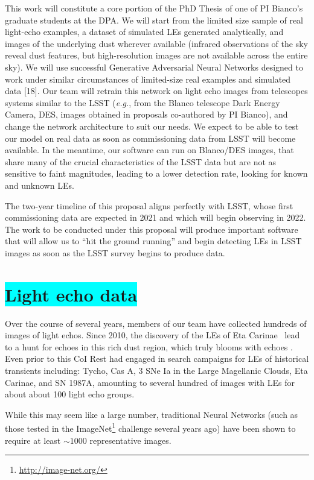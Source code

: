 \documentclass{proposalnsf}
\newcommand{\armin}[1]{\colorbox{cyan}{#1}}
\newcommand{\eg}{\emph{e.g.}}
\begin{document}
 This work will constitute a core portion of the PhD Thesis of one of PI Bianco’s graduate students at the DPA.   We will start from the limited size sample of real light-echo examples, a dataset of simulated LEs generated analytically, and images of the underlying dust wherever available (infrared observations of the sky reveal dust features, but high-resolution images are not available across the entire sky).   We will use successful Generative Adversarial Neural Networks designed to work under similar circumstances of limited-size real examples and simulated data [18].   Our team will retrain this network on light echo images from telescopes systems similar to the LSST (\eg,  from the Blanco telescope Dark Energy Camera, DES, images obtained in proposals co-authored by PI Bianco), and change the network architecture to suit our needs.  We expect to be able to test our model on real data as soon as commissioning data from LSST will become available.   In the meantime, our software can run on Blanco/DES images, that share many of the crucial characteristics of the LSST data but are not as sensitive to faint magnitudes, leading to a lower detection rate, looking for known and unknown LEs.


The two-year timeline of this proposal aligns perfectly with LSST, whose first commissioning data are expected in 2021 and which will begin observing in 2022.   The work to be conducted under this proposal will produce important software that will allow us to “hit the ground running” and begin detecting LEs in LSST images as soon as the LSST survey begins to produce data.  

\section{\armin{Light echo data}}
Over the course of several years, members of our team have collected hundreds of images of light echos.  Since 2010, the discovery of the LEs of Eta Carinae~\citep{Rest2019} lead to a hunt for echoes in this rich dust region, which truly blooms with echoes .  Even prior to this CoI Rest had engaged in search campaigns for LEs of historical transients including: Tycho, Cas A, 3 SNe Ia in the Large Magellanic Clouds, Eta Carinae, and SN 1987A, amounting to several hundred of images with LEs for about about 100 light echo groups.   

While this may seem like a large number, traditional Neural Networks (such as those tested in the ImageNet\footnote{\url{http://image-net.org/}} challenge several years ago) have been shown to require at least $\sim 1000$ representative images.
\end{document}
